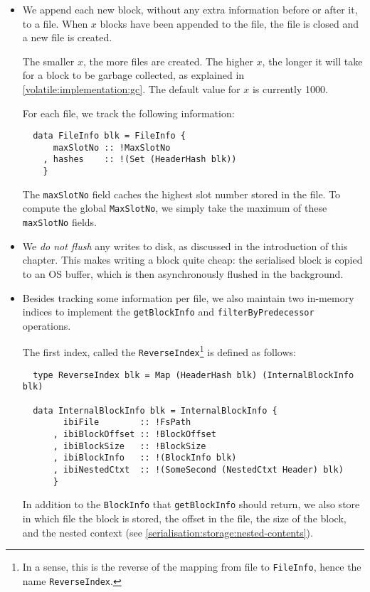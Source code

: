 \begin{itemize}
\item We append each new block, without any extra information before or after
  it, to a file. When $x$ blocks have been appended to the file, the file is
  closed and a new file is created.

  The smaller $x$, the more files are created. The
  higher $x$, the longer it will take for a block to be garbage collected, as
  explained in \cref{volatile:implementation:gc}. The default value for $x$ is
  currently \num{1000}.

  For each file, we track the following information:
  \begin{lstlisting}
  data FileInfo blk = FileInfo {
      maxSlotNo :: !MaxSlotNo
    , hashes    :: !(Set (HeaderHash blk))
    }
  \end{lstlisting}
  The \lstinline!maxSlotNo! field caches the highest slot number stored in the
  file. To compute the global \lstinline!MaxSlotNo!, we simply take the maximum
  of these \lstinline!maxSlotNo! fields.

\item We \emph{do not flush} any writes to disk, as discussed in the
  introduction of this chapter. This makes writing a block quite cheap: the
  serialised block is copied to an OS buffer, which is then asynchronously
  flushed in the background.

\item Besides tracking some information per file, we also maintain two in-memory
  indices to implement the \lstinline!getBlockInfo! and
  \lstinline!filterByPredecessor! operations.

  The first index, called the \lstinline!ReverseIndex!\footnote{In a sense, this
  is the reverse of the mapping from file to \lstinline!FileInfo!, hence the
  name \lstinline!ReverseIndex!.} is defined as follows:
  \begin{lstlisting}
  type ReverseIndex blk = Map (HeaderHash blk) (InternalBlockInfo blk)

  data InternalBlockInfo blk = InternalBlockInfo {
        ibiFile        :: !FsPath
      , ibiBlockOffset :: !BlockOffset
      , ibiBlockSize   :: !BlockSize
      , ibiBlockInfo   :: !(BlockInfo blk)
      , ibiNestedCtxt  :: !(SomeSecond (NestedCtxt Header) blk)
      }
  \end{lstlisting}
  In addition to the \lstinline!BlockInfo! that \lstinline!getBlockInfo! should
  return, we also store in which file the block is stored, the offset in the
  file, the size of the block, and the nested context (see
  \cref{serialisation:storage:nested-contents}).


\end{itemize}
